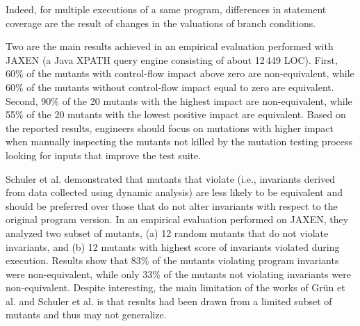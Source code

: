 Indeed, for multiple executions of a same program, differences in statement coverage are the result of changes in the valuations of branch conditions.

Two are the main results achieved in an empirical evaluation performed with JAXEN (a Java XPATH query engine consisting of about 12\,449 LOC). 
First, 60\% of the mutants with control-flow impact above zero are non-equivalent, while 60\% of the mutants without control-flow impact equal to zero are equivalent. 
Second, 90\% of the 20 mutants with the highest impact are non-equivalent, while 55\% of the 20 mutants with the lowest positive impact are equivalent. 
Based on the reported results, engineers should focus on mutations with higher impact when manually inspecting the mutants not killed by the mutation testing process looking for inputs that improve the test suite.

Schuler et al. \cite{schuler2009efficient} demonstrated that mutants that violate  (i.e., invariants derived from data collected using dynamic analysis) are less likely to be equivalent and should be preferred over those that do not alter invariants with respect to the original program version. In an empirical evaluation performed on JAXEN, they analyzed two subset of mutants, 
(a) 12 random mutants that do not violate invariants, and (b) 12 mutants with highest score of invariants violated during execution. 
Results show that 83\% of the mutants violating program invariants were non-equivalent, while only 33\% of 
the mutants not violating invariants were non-equivalent.
Despite interesting, the main limitation of the works of Gr\"{u}n et al. \cite{grun2009impact} and Schuler et al. \cite{schuler2009efficient} is that results had been drawn from a limited subset of mutants and thus may not generalize.

